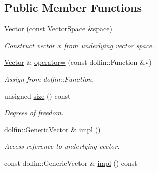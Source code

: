 \subsection*{Public Member Functions}
\begin{DoxyCompactItemize}
\item 
\hyperlink{classSpacy_1_1FEniCS_1_1Vector_ad73e826490b7b7be5588e9c0c9318cb5_ad73e826490b7b7be5588e9c0c9318cb5}{Vector} (const \hyperlink{classSpacy_1_1VectorSpace}{Vector\+Space} \&\hyperlink{classSpacy_1_1VectorBase_a95e87ce98f5a7646055d4e87e6024044_a95e87ce98f5a7646055d4e87e6024044}{space})
\begin{DoxyCompactList}\small\item\em Construct vector $x$ from underlying vector space. \end{DoxyCompactList}\item 
\hyperlink{classSpacy_1_1FEniCS_1_1Vector}{Vector} \& \hyperlink{classSpacy_1_1FEniCS_1_1Vector_ad4d68b813d9374aa83f37ec2b3ad02fc_ad4d68b813d9374aa83f37ec2b3ad02fc}{operator=} (const dolfin\+::\+Function \&v)
\begin{DoxyCompactList}\small\item\em Assign from dolfin\+::\+Function. \end{DoxyCompactList}\item 
unsigned \hyperlink{classSpacy_1_1FEniCS_1_1Vector_ae5357c7dc9622b782e9aa10a98c610a8_ae5357c7dc9622b782e9aa10a98c610a8}{size} () const 
\begin{DoxyCompactList}\small\item\em Degrees of freedom. \end{DoxyCompactList}\item 
\hypertarget{classSpacy_1_1FEniCS_1_1Vector_a3e0841a23289f7a843d8a3cf2720a03f}{}dolfin\+::\+Generic\+Vector \& \hyperlink{classSpacy_1_1FEniCS_1_1Vector_a3e0841a23289f7a843d8a3cf2720a03f}{impl} ()\label{classSpacy_1_1FEniCS_1_1Vector_a3e0841a23289f7a843d8a3cf2720a03f}

\begin{DoxyCompactList}\small\item\em Access reference to underlying vector. \end{DoxyCompactList}\item 
\hypertarget{classSpacy_1_1FEniCS_1_1Vector_a733e2561e0dfa5fea7d5812d31f879bd}{}const dolfin\+::\+Generic\+Vector \& \hyperlink{classSpacy_1_1FEniCS_1_1Vector_a733e2561e0dfa5fea7d5812d31f879bd}{impl} () const \label{classSpacy_1_1FEniCS_1_1Vector_a733e2561e0dfa5fea7d5812d31f879bd}


\end{DoxyCompactItemize}

